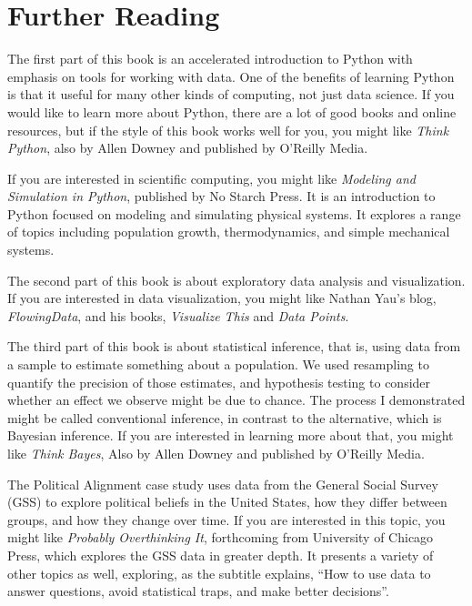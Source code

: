 \hypertarget{further-reading}{%
\chapter{Further Reading}\label{further-reading}}

The first part of this book is an accelerated introduction to Python
with emphasis on tools for working with data. One of the benefits of
learning Python is that it useful for many other kinds of computing, not
just data science. If you would like to learn more about Python, there
are a lot of good books and online resources, but if the style of this
book works well for you, you might like \emph{Think Python}, also by
Allen Downey and published by O'Reilly Media.

If you are interested in scientific computing, you might like
\emph{Modeling and Simulation in Python}, published by No Starch Press.
It is an introduction to Python focused on modeling and simulating
physical systems. It explores a range of topics including population
growth, thermodynamics, and simple mechanical systems.

The second part of this book is about exploratory data analysis and
visualization. If you are interested in data visualization, you might
like Nathan Yau's blog, \emph{FlowingData}, and his books,
\emph{Visualize This} and \emph{Data Points}.

The third part of this book is about statistical inference, that is,
using data from a sample to estimate something about a population. We
used resampling to quantify the precision of those estimates, and
hypothesis testing to consider whether an effect we observe might be due
to chance. The process I demonstrated might be called conventional
inference, in contrast to the alternative, which is Bayesian inference.
If you are interested in learning more about that, you might like
\emph{Think Bayes}, Also by Allen Downey and published by O'Reilly
Media.

The Political Alignment case study uses data from the General Social
Survey (GSS) to explore political beliefs in the United States, how they
differ between groups, and how they change over time. If you are
interested in this topic, you might like \emph{Probably Overthinking
It}, forthcoming from University of Chicago Press, which explores the
GSS data in greater depth. It presents a variety of other topics as
well, exploring, as the subtitle explains, ``How to use data to answer
questions, avoid statistical traps, and make better decisions''.

